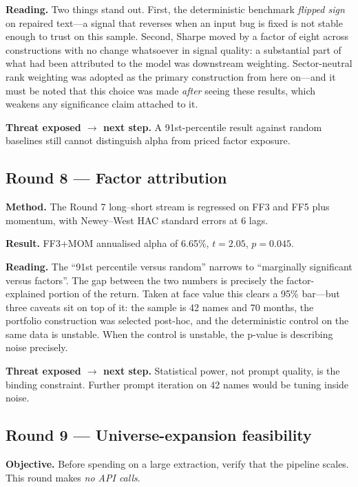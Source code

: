 \documentclass[11pt]{article}
\begin{document}
\textbf{Reading.} Two things stand out. First, the deterministic benchmark \emph{flipped
sign} on repaired text---a signal that reverses when an input bug is fixed is not stable
enough to trust on this sample. Second, Sharpe moved by a factor of eight across
constructions with no change whatsoever in signal quality: a substantial part of what had
been attributed to the model was downstream weighting. Sector-neutral rank weighting was
adopted as the primary construction from here on---and it must be noted that this choice
was made \emph{after} seeing these results, which weakens any significance claim attached
to it.

\textbf{Threat exposed $\rightarrow$ next step.} A 91st-percentile result against random
baselines still cannot distinguish alpha from priced factor exposure.

\subsection{Round 8 --- Factor attribution}

\textbf{Method.} The Round 7 long--short stream is regressed on FF3 and FF5 plus momentum,
with Newey--West HAC standard errors at 6 lags.

\textbf{Result.} FF3+MOM annualised alpha of 6.65\%, $t = 2.05$, $p = 0.045$.

\textbf{Reading.} The ``91st percentile versus random'' narrows to ``marginally
significant versus factors''. The gap between the two numbers is precisely the
factor-explained portion of the return. Taken at face value this clears a 95\% bar---but
three caveats sit on top of it: the sample is 42 names and 70 months, the portfolio
construction was selected post-hoc, and the deterministic control on the same data is
unstable. When the control is unstable, the p-value is describing noise precisely.

\textbf{Threat exposed $\rightarrow$ next step.} Statistical power, not prompt quality, is
the binding constraint. Further prompt iteration on 42 names would be tuning inside noise.

\subsection{Round 9 --- Universe-expansion feasibility}

\textbf{Objective.} Before spending on a large extraction, verify that the pipeline scales.
This round makes \emph{no API calls}.
\end{document}
